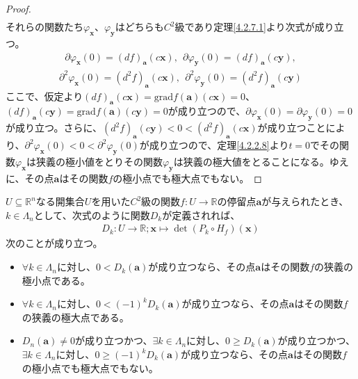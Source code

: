 \documentclass[dvipdfmx]{jsarticle}
\begin{document}
\begin{proof}
\begin{align*}
\end{align*}
それらの関数たち$\varphi_{\mathbf{x}}$、$\varphi_{\mathbf{y}}$はどちらも$C^{2}$級であり定理\ref{4.2.7.1}より次式が成り立つ。
\begin{align*}
\partial\varphi_{\mathbf{x}}(0) = (df)_{\mathbf{a}}\left( c\mathbf{x} \right),\ \ \partial\varphi_{\mathbf{y}}(0) = (df)_{\mathbf{a}}\left( c\mathbf{y} \right),
\end{align*}
\begin{align*}
\partial^{2}\varphi_{\mathbf{x}}(0) = \left( d^{2}f \right)_{\mathbf{a}}\left( c\mathbf{x} \right),\ \ \partial^{2}\varphi_{\mathbf{y}}(0) = \left( d^{2}f \right)_{\mathbf{a}}\left( c\mathbf{y} \right)
\end{align*}
ここで、仮定より$(df)_{\mathbf{a}}\left( c\mathbf{x} \right) = \mathrm{grad}f\left( \mathbf{a} \right)\left( c\mathbf{x} \right) = 0$、$(df)_{\mathbf{a}}\left( c\mathbf{y} \right) = \mathrm{grad}f\left( \mathbf{a} \right)\left( c\mathbf{y} \right) = 0$が成り立つので、$\partial\varphi_{\mathbf{x}}(0) = \partial\varphi_{\mathbf{y}}(0) = 0$が成り立つ。さらに、$\left( d^{2}f \right)_{\mathbf{a}}\left( c\mathbf{y} \right) < 0 < \left( d^{2}f \right)_{\mathbf{a}}\left( c\mathbf{x} \right)$が成り立つことにより、$\partial^{2}\varphi_{\mathbf{x}}(0) < 0 < \partial^{2}\varphi_{\mathbf{y}}(0)$が成り立つので、定理\ref{4.2.2.8}より$t = 0$でその関数$\varphi_{\mathbf{x}}$は狭義の極小値をとりその関数$\varphi_{\mathbf{y}}$は狭義の極大値をとることになる。ゆえに、その点$\mathbf{a}$はその関数$f$の極小点でも極大点でもない。
\end{proof}
\begin{thm}\label{4.4.3.12}
$U \subseteq \mathbb{R}^{n}$なる開集合$U$を用いた$C^{2}$級の関数$f:U \rightarrow \mathbb{R}$の停留点$\mathbf{a}$が与えられたとき、$k \in \varLambda_{n}$として、次式のように関数$D_{k}$が定義されれば、
\begin{align*}
D_{k}:U \rightarrow \mathbb{R};\mathbf{x} \mapsto \det{\left( P_{k} \circ H_{f} \right)\left( \mathbf{x} \right)}
\end{align*}
次のことが成り立つ。
\begin{itemize}
\item
  $\forall k \in \varLambda_{n}$に対し、$0 < D_{k}\left( \mathbf{a} \right)$が成り立つなら、その点$\mathbf{a}$はその関数$f$の狭義の極小点である。
\item
  $\forall k \in \varLambda_{n}$に対し、$0 < ( - 1)^{k}D_{k}\left( \mathbf{a} \right)$が成り立つなら、その点$\mathbf{a}$はその関数$f$の狭義の極大点である。
\item
  $D_{n}\left( \mathbf{a} \right) \neq 0$が成り立つかつ、$\exists k \in \varLambda_{n}$に対し、$0 \geq D_{k}\left( \mathbf{a} \right)$が成り立つかつ、$\exists k \in \varLambda_{n}$に対し、$0 \geq ( - 1)^{k}D_{k}\left( \mathbf{a} \right)$が成り立つなら、その点$\mathbf{a}$はその関数$f$の極小点でも極大点でもない。
\end{itemize}
\end{thm}
\end{document}
